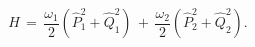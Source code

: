\begin{equation}
H \, = \, \frac{\omega_1}{2} \left({\hat P}_1^2 + {\hat Q}_1^2\right) \, + \,
\frac{\omega_2}{2} \left({\hat P}_2^2 + {\hat Q}_2^2\right).
\label{HQP}
\end{equation}

